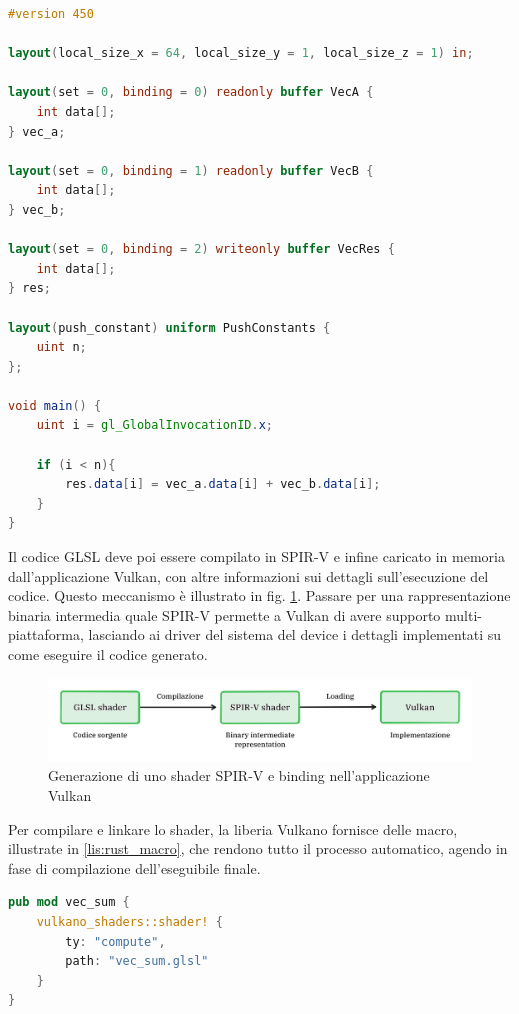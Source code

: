 \vspace{5mm}
\begin{lstlisting}[language=GLSL, caption=Shader GLSL di somma di vettori, label=lis:vulkan_shader]
#version 450

layout(local_size_x = 64, local_size_y = 1, local_size_z = 1) in;

layout(set = 0, binding = 0) readonly buffer VecA {
    int data[];
} vec_a;

layout(set = 0, binding = 1) readonly buffer VecB {
    int data[];
} vec_b;

layout(set = 0, binding = 2) writeonly buffer VecRes {
    int data[];
} res;

layout(push_constant) uniform PushConstants {
    uint n;
};

void main() {
    uint i = gl_GlobalInvocationID.x;

    if (i < n){
        res.data[i] = vec_a.data[i] + vec_b.data[i];
    }
}    
\end{lstlisting}
\vspace{5mm}

Il codice GLSL deve poi essere compilato in SPIR-V e infine caricato in memoria dall'applicazione Vulkan, con altre informazioni sui dettagli sull'esecuzione del codice. Questo meccanismo è illustrato in fig. \ref{fig:shader}. Passare per una rappresentazione binaria intermedia quale SPIR-V permette a Vulkan di avere supporto multi-piattaforma, lasciando ai driver del sistema del device i dettagli implementati su come eseguire il codice generato.

\begin{figure}[ht]
    \centering
    \includegraphics[width=.9\linewidth]{images/chapter2/shader.png}
    \caption{Generazione di uno shader SPIR-V e binding nell'applicazione Vulkan}
    \label{fig:shader}
\end{figure}

Per compilare e linkare lo shader, la liberia Vulkano fornisce delle macro, illustrate in \ref{lis:rust_macro}, che rendono tutto il processo automatico, agendo in fase di compilazione dell'eseguibile finale.

\newpage

\vspace{5mm}
\begin{lstlisting}[language=Rust, caption=Compilazione e binding dello shader GLSL, label=lis:rust_macro]
pub mod vec_sum {
    vulkano_shaders::shader! {
        ty: "compute",
        path: "vec_sum.glsl"
    }
}    
\end{lstlisting}
\vspace{5mm}

